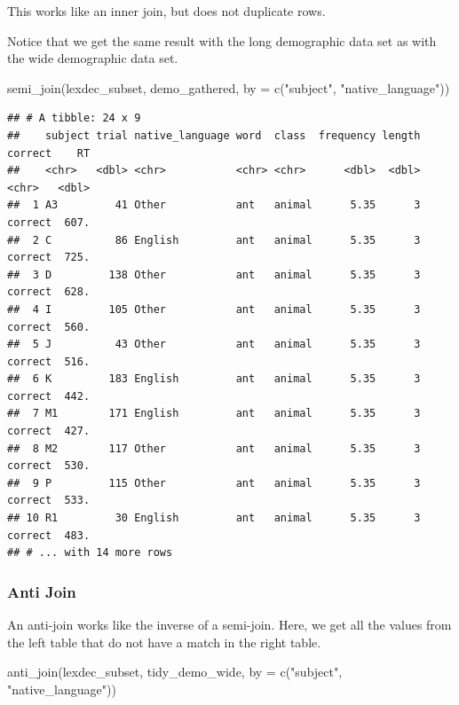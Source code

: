 \documentclass[
]{book}
\newenvironment{Shaded}{\begin{snugshade}}{\end{snugshade}}
\newcommand{\AttributeTok}[1]{\textcolor[rgb]{0.77,0.63,0.00}{#1}}
\newcommand{\FunctionTok}[1]{\textcolor[rgb]{0.00,0.00,0.00}{#1}}
\newcommand{\NormalTok}[1]{#1}
\newcommand{\StringTok}[1]{\textcolor[rgb]{0.31,0.60,0.02}{#1}}
\begin{document}
This works like an inner join, but does not duplicate rows.

Notice that we get the same result with the long demographic data set as with the wide demographic data set.

\begin{Shaded}
\begin{Highlighting}[]
\FunctionTok{semi\_join}\NormalTok{(lexdec\_subset, demo\_gathered, }\AttributeTok{by =} \FunctionTok{c}\NormalTok{(}\StringTok{"subject"}\NormalTok{, }\StringTok{"native\_language"}\NormalTok{))}
\end{Highlighting}
\end{Shaded}

\begin{verbatim}
## # A tibble: 24 x 9
##    subject trial native_language word  class  frequency length correct    RT
##    <chr>   <dbl> <chr>           <chr> <chr>      <dbl>  <dbl> <chr>   <dbl>
##  1 A3         41 Other           ant   animal      5.35      3 correct  607.
##  2 C          86 English         ant   animal      5.35      3 correct  725.
##  3 D         138 Other           ant   animal      5.35      3 correct  628.
##  4 I         105 Other           ant   animal      5.35      3 correct  560.
##  5 J          43 Other           ant   animal      5.35      3 correct  516.
##  6 K         183 English         ant   animal      5.35      3 correct  442.
##  7 M1        171 English         ant   animal      5.35      3 correct  427.
##  8 M2        117 Other           ant   animal      5.35      3 correct  530.
##  9 P         115 Other           ant   animal      5.35      3 correct  533.
## 10 R1         30 English         ant   animal      5.35      3 correct  483.
## # ... with 14 more rows
\end{verbatim}

\hypertarget{anti-join}{%
\subsubsection{Anti Join}\label{anti-join}}

An anti-join works like the inverse of a semi-join. Here, we get all the values from the left table that do not have a match in the right table.

\begin{Shaded}
\begin{Highlighting}[]
\FunctionTok{anti\_join}\NormalTok{(lexdec\_subset, tidy\_demo\_wide, }\AttributeTok{by =} \FunctionTok{c}\NormalTok{(}\StringTok{"subject"}\NormalTok{, }\StringTok{"native\_language"}\NormalTok{))}
\end{Highlighting}
\end{Shaded}
\end{document}
